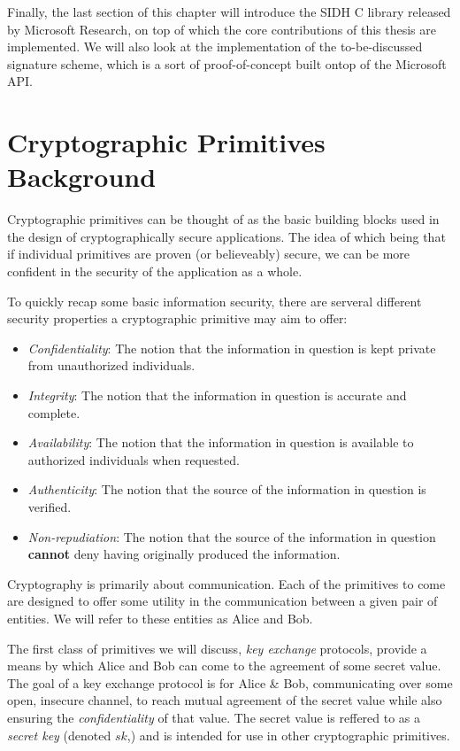 Finally, the last section of this chapter will introduce the SIDH C library released by Microsoft Research, on top of which the core contributions of this thesis are implemented. We will also look at the implementation of the to-be-discussed signature scheme, which is a sort of proof-of-concept built ontop of the Microsoft API.\\


\section{Cryptographic Primitives Background}

Cryptographic primitives can be thought of as the basic building blocks used in the design of cryptographically secure applications. The idea of which being that if individual primitives are proven (or believeably) secure, we can be more confident in the security of the application as a whole.

To quickly recap some basic information security, there are serveral different security properties a cryptographic primitive may aim to offer:
\begin{itemize}
\item \emph{Confidentiality}:
The notion that the information in question is kept private from unauthorized individuals.
\item \emph{Integrity}:
The notion that the information in question is accurate and complete.
\item \emph{Availability}:
The notion that the information in question is available to authorized individuals when requested.
\item \emph{Authenticity}:
The notion that the source of the information in question is verified.
\item \emph{Non-repudiation}:
The notion that the source of the information in question \textbf{cannot} deny having originally produced the information.
\end{itemize}

Cryptography is primarily about communication. Each of the primitives to come are designed to offer some utility in the communication between a given pair of entities. We will refer to these entities as Alice and Bob.

The first class of primitives we will discuss, \emph{key exchange} protocols, provide a means by which Alice and Bob can come to the agreement of some secret value. The goal of a key exchange protocol is for Alice \& Bob, communicating over some open, insecure channel, to reach mutual agreement of the secret value while also ensuring the \emph{confidentiality} of that value. The secret value is reffered to as a \emph{secret key} (denoted $sk$,) and is intended for use in other cryptographic primitives. 

